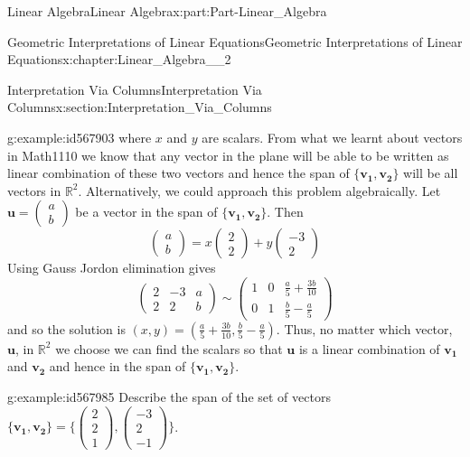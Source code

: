 \documentclass[oneside,10pt,]{book}
\numberwithin{equation}{section}
\newcommand{\amp}{&}
\begin{document}
\begin{partptx}{Linear Algebra}{}{Linear Algebra}{}{}{x:part:Part-Linear_Algebra}
\begin{chapterptx}{Geometric Interpretations of Linear Equations}{}{Geometric Interpretations of Linear Equations}{}{}{x:chapter:Linear_Algebra__2}
\begin{sectionptx}{Interpretation Via Columns}{}{Interpretation Via Columns}{}{}{x:section:Interpretation_Via_Columns}
\begin{example}{}{g:example:id567903}
where \(x\) and \(y\) are scalars. From what we learnt about vectors in Math1110 we know that any vector in the plane will be able to be written as linear combination of these two vectors and hence the span of \(\{\mathbf{v_1, v_2}\}\) will be all vectors in \(\mathbb{R}^2\). Alternatively, we could approach this problem algebraically. Let \(\mathbf{u}=\begin{pmatrix} a \\ b \end{pmatrix}\) be a vector in the span of \(\{\mathbf{v_1, v_2}\}\). Then%
\begin{equation*}
\begin{pmatrix} a \\ b \end{pmatrix}=x \begin{pmatrix} 2 \\ 2 \end{pmatrix}+y \begin{pmatrix} -3 \\ 2 \end{pmatrix}
\end{equation*}
Using Gauss Jordon elimination gives%
\begin{equation*}
\begin{pmatrix} 2 \amp -3 \amp a \\ 2 \amp 2 \amp b \end{pmatrix} \sim \begin{pmatrix} 1 \amp 0 \amp \frac{a}{5}+\frac{3b}{10} \\ 0 \amp 1 \amp \frac{b}{5}-\frac{a}{5} \end{pmatrix} 
\end{equation*}
and so the solution is \((x,y)=\left(\frac{a}{5}+\frac{3b}{10},\frac{b}{5}-\frac{a}{5}\right)\). Thus, no matter which vector, \(\mathbf{u}\), in \(\mathbb{R}^2\) we choose we can find the scalars so that \(\mathbf{u}\) is a linear combination of \(\mathbf{v_1}\) and \(\mathbf{v_2}\) and hence in the span of \(\{\mathbf{v_1, v_2}\}\).%
\end{example}
\begin{example}{}{g:example:id567985}%
Describe the span of the set of vectors \(\{\mathbf{v_1, v_2}\}=\Bigg\{\begin{pmatrix} 2 \\ 2 \\ 1 \end{pmatrix}, \begin{pmatrix} -3 \\ 2 \\ -1 \end{pmatrix} \Bigg\}\).%

\end{example}
\end{sectionptx}
\end{chapterptx}
\end{partptx}
\end{document}
